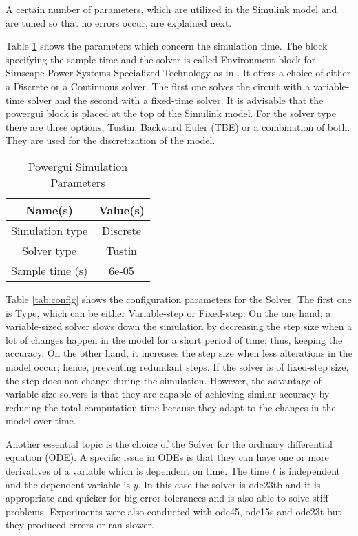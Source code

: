 A certain number of parameters, which are utilized in the Simulink model and are tuned so that no errors occur, are explained next. 

Table \ref{tab:powergui} shows the parameters which concern the simulation time. The block specifying the sample time and the solver is called Environment block for Simscape Power Systems Specialized Technology as in \citet{powerguiMatlab}. It offers a choice of either a Discrete or a Continuous solver. The first one solves the circuit with a variable-time solver and the second with a fixed-time solver. It is advisable that the powergui block is placed at the top of the Simulink model. For the solver type there are three options, Tustin, Backward Euler (TBE) or a combination of both. They are used for the discretization of the model.

\begin{table}
\centering
\begin{tabular}{ |c|c| } 
 \hline
 Name(s) & Value(s) \\
 \hline\hline
 Simulation type & Discrete  \\ 
 Solver type & Tustin \\ 
 Sample time (s) & 6e-05 \\ 
 \hline
\end{tabular}
\caption{Powergui Simulation Parameters}
\label{tab:powergui}
\end{table}

Table \ref{tab:config} shows the configuration parameters for the Solver. The first one is Type, which can be either Variable-step or Fixed-step. On the one hand, a variable-sized solver slows down the simulation by decreasing the step size when a lot of changes happen in the model for a short period of time; thus, keeping the accuracy. On the other hand, it increases the step size when less alterations in the model occur; hence, preventing redundant steps. If the solver is of fixed-step size, the step does not change during the simulation. However, the advantage of variable-size solvers is that they are capable of achieving similar accuracy by reducing the total computation time because they adapt to the changes in the model over time.

Another essential topic is the choice of the Solver for the ordinary differential equation (ODE). A specific issue in ODEs is that they can have one or more derivatives of a variable which is dependent on time. The time $t$ is independent and the dependent variable is $y$. In this case the solver is ode23tb and it is appropriate and quicker for big error tolerances and is also able to solve stiff problems. Experiments were also conducted with ode45, ode15s and ode23t but they produced errors or ran slower.

